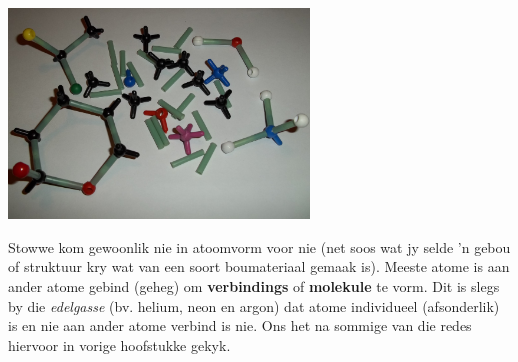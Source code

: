 \begin{minipage}{.4\textwidth}
 \begin{center}
\includegraphics[width=0.6\textwidth]{photos/atom_model_kit.jpg}
 \end{center}
\end{minipage}

      \label{m38120*id307459}
Stowwe kom gewoonlik nie in atoomvorm voor nie (net soos wat jy selde 'n gebou of struktuur kry wat van een soort boumateriaal gemaak is). Meeste atome is aan ander atome  gebind (geheg) om \textbf{verbindings} of \textbf{molekule} te vorm. Dit is slegs by die \textsl{edelgasse} (bv. helium, neon en argon) dat atome individueel (afsonderlik) is en nie aan ander atome verbind is nie.  Ons het na sommige van die redes hiervoor in vorige hoofstukke gekyk.\par \pagebreak
